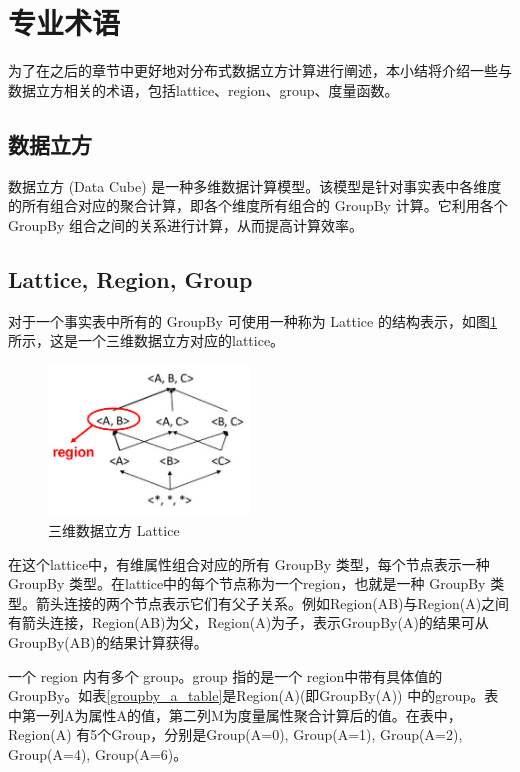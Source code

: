 \section{专业术语}

为了在之后的章节中更好地对分布式数据立方计算进行阐述，本小结将介绍一些与数据立方相关的术语，包括lattice、region、group、度量函数。

\subsection{数据立方}
数据立方 (Data Cube) \cite{gray1997data} 是一种多维数据计算模型。该模型是针对事实表中各维度的所有组合对应的聚合计算，即各个维度所有组合的 GroupBy 计算。它利用各个 GroupBy 组合之间的关系进行计算，从而提高计算效率。

\subsection{Lattice, Region, Group}


对于一个事实表中所有的 GroupBy 可使用一种称为 Lattice 的结构表示，如图\ref{abc_lattice} 所示，这是一个三维数据立方对应的lattice。

\begin{figure}[!htb]
\centering\includegraphics[width=2.1in]{picture/ch_preliminary/abc_lattice} 
\caption{三维数据立方 Lattice}\label{abc_lattice} 
\end{figure} 

在这个lattice中，有维属性组合对应的所有 GroupBy 类型，每个节点表示一种 GroupBy 类型。在lattice中的每个节点称为一个region，也就是一种 GroupBy 类型。箭头连接的两个节点表示它们有父子关系。例如Region(AB)与Region(A)之间有箭头连接，Region(AB)为父，Region(A)为子，表示GroupBy(A)的结果可从GroupBy(AB)的结果计算获得。

一个 region 内有多个 group。group 指的是一个
region中带有具体值的 GroupBy。如表\ref{groupby_a_table}是Region(A)(即GroupBy(A)) 中的group。表中第一列A为属性A的值，第二列M为度量属性聚合计算后的值。在表中，Region(A) 有5个Group，分别是Group(A=0), Group(A=1), Group(A=2), Group(A=4), Group(A=6)。

